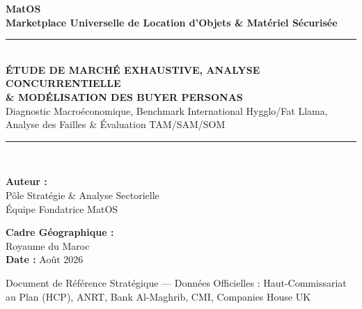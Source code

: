 \documentclass[11pt,a4paper]{report}
\begin{document}
\begin{titlepage}
    \centering
    \vspace*{1.5cm}
    {\Huge\bfseries\color{primaryNavy} MatOS}\\[0.4cm]
    {\LARGE\bfseries\color{accentTeal} Marketplace Universelle de Location d'Objets \& Matériel Sécurisée}\\[1.5cm]
    
    \rule{\linewidth}{1.8pt}\\[0.4cm]
    {\huge\bfseries ÉTUDE DE MARCHÉ EXHAUSTIVE, ANALYSE CONCURRENTIELLE\\\& MODÉLISATION DES BUYER PERSONAS}\\[0.3cm]
    {\large Diagnostic Macroéconomique, Benchmark International Hygglo/Fat Llama, Analyse des Failles \& Évaluation TAM/SAM/SOM}\\[0.4cm]
    \rule{\linewidth}{1.8pt}\\[2.2cm]
    
    \begin{minipage}{0.45\textwidth}
        \begin{flushleft} \large
            \textbf{Auteur :}\\
            Pôle Stratégie \& Analyse Sectorielle\\
            Équipe Fondatrice MatOS
        \end{flushleft}
    \end{minipage}
    \hfill
    \begin{minipage}{0.45\textwidth}
        \begin{flushright} \large
            \textbf{Cadre Géographique :}\\
            Royaume du Maroc\\
            \textbf{Date :} Août 2026
        \end{flushright}
    \end{minipage}
    
    \vfill
    {\small Document de Référence Stratégique --- Données Officielles : Haut-Commissariat au Plan (HCP), ANRT, Bank Al-Maghrib, CMI, Companies House UK}
\end{titlepage}

\tableofcontents
\newpage
\end{document}
